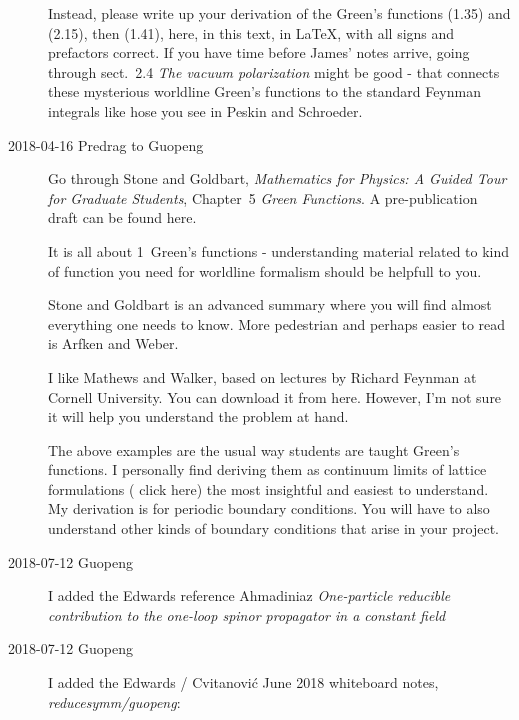 \begin{description}
Instead, please write up your derivation of the Green's functions (1.35) and
(2.15), then (1.41), here, in this text, in LaTeX, with all signs and
prefactors correct. If you have time before James' notes arrive, going through
sect.~2.4 {\em The vacuum polarization} might be good - that connects these
mysterious worldline Green's functions to the standard Feynman integrals like
hose you see in Peskin and Schroeder.

\item[2018-04-16 Predrag to Guopeng]
Go through
Stone and Goldbart, {\em Mathematics for Physics: A Guided Tour
for Graduate Students}, Chapter~5  \emph{Green Functions}.
A pre-publication draft can be found
{here}.

It is all about 1\dmn\ Green's functions - understanding material related to
kind of function you need for worldline formalism should be helpfull to you.

Stone and Goldbart is an advanced summary where you will find
almost everything one needs to know. More pedestrian and perhaps easier to
read is Arfken and Weber.

I like Mathews and Walker, based on lectures by Richard
Feynman at Cornell University. You can download it from
{here}. However, I'm not sure it will help you understand the problem at
hand.

The above examples are the usual way students are taught Green's functions. I
personally find deriving them as continuum limits of lattice formulations
(
{click here}) the most insightful and easiest to understand. My derivation
is for periodic boundary conditions. You will have to also understand other kinds of
boundary conditions that arise in your project.

\item[2018-07-12 Guopeng]
I added the Edwards reference
Ahmadiniaz \etal{}
{\em One-particle reducible contribution to the one-loop spinor propagator in a constant field}

\item[2018-07-12 Guopeng]
I added the Edwards / Cvitanovi\'c June 2018 whiteboard notes, \emph{reducesymm/guopeng}:


\end{description}
